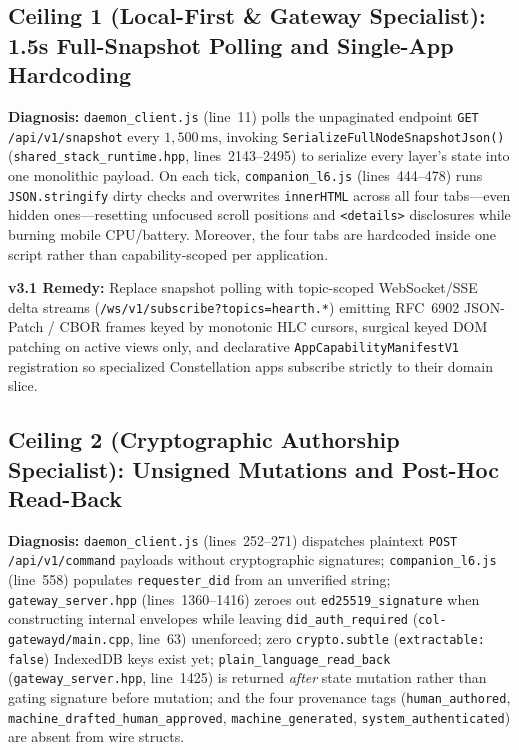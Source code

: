 \subsection{Ceiling 1 (Local-First \& Gateway Specialist): 1.5s Full-Snapshot Polling and Single-App Hardcoding}
\textbf{Diagnosis:} \texttt{daemon\_client.js} (line~11) polls the unpaginated endpoint \texttt{GET /api/v1/snapshot} every $1{,}500\,\mathrm{ms}$, invoking \texttt{SerializeFullNodeSnapshotJson()} (\texttt{shared\_stack\_runtime.hpp}, lines~2143--2495) to serialize every layer's state into one monolithic payload. On each tick, \texttt{companion\_l6.js} (lines~444--478) runs \texttt{JSON.stringify} dirty checks and overwrites \texttt{innerHTML} across all four tabs---even hidden ones---resetting unfocused scroll positions and \texttt{<details>} disclosures while burning mobile CPU/battery. Moreover, the four tabs are hardcoded inside one script rather than capability-scoped per application.

\textbf{v3.1 Remedy:} Replace snapshot polling with topic-scoped WebSocket/SSE delta streams (\texttt{/ws/v1/subscribe?topics=hearth.*}) emitting RFC~6902 JSON-Patch / CBOR frames keyed by monotonic HLC cursors, surgical keyed DOM patching on active views only, and declarative \texttt{AppCapabilityManifestV1} registration so specialized Constellation apps subscribe strictly to their domain slice.

\subsection{Ceiling 2 (Cryptographic Authorship Specialist): Unsigned Mutations and Post-Hoc Read-Back}
\textbf{Diagnosis:} \texttt{daemon\_client.js} (lines~252--271) dispatches plaintext \texttt{POST /api/v1/command} payloads without cryptographic signatures; \texttt{companion\_l6.js} (line~558) populates \texttt{requester\_did} from an unverified string; \texttt{gateway\_server.hpp} (lines~1360--1416) zeroes out \texttt{ed25519\_signature} when constructing internal envelopes while leaving \texttt{did\_auth\_required} (\texttt{col-gatewayd/main.cpp}, line~63) unenforced; zero \texttt{crypto.subtle} (\texttt{extractable: false}) IndexedDB keys exist yet; \texttt{plain\_language\_read\_back} (\texttt{gateway\_server.hpp}, line~1425) is returned \textit{after} state mutation rather than gating signature before mutation; and the four provenance tags (\texttt{human\_authored}, \texttt{machine\_drafted\_human\_approved}, \texttt{machine\_generated}, \texttt{system\_authenticated}) are absent from wire structs.

